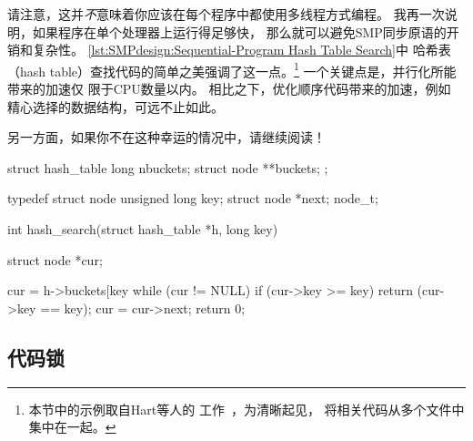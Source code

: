 请注意，这并\emph{不}意味着你应该在每个程序中都使用多线程方式编程。
我再一次说明，如果程序在单个处理器上运行得足够快，
那么就可以避免SMP同步原语的开销和复杂性。
\cref{lst:SMPdesign:Sequential-Program Hash Table Search}中
哈希表（hash table）查找代码的简单之美强调了这一点。\footnote{
	本节中的示例取自Hart等人的
	工作~\cite{ThomasEHart2006a}，为清晰起见，
	将相关代码从多个文件中集中在一起。}
一个关键点是，并行化所能带来的加速仅
限于CPU数量以内。
相比之下，优化顺序代码带来的加速，例如
精心选择的数据结构，可远不止如此。

\QuickQuizEnd

另一方面，如果你不在这种幸运的情况中，请继续阅读！

\begin{listing}
\begin{VerbatimL}[commandchars=\\\@\$]
struct hash_table
{
	long nbuckets;
	struct node **buckets;
};

typedef struct node {
	unsigned long key;
	struct node *next;
} node_t;

int hash_search(struct hash_table *h, long key)
{
	struct node *cur;

	cur = h->buckets[key %
	while (cur != NULL) {
		if (cur->key >= key) {
			return (cur->key == key);
		}
		cur = cur->next;
	}
	return 0;
}
\end{VerbatimL}
\caption{顺序程序哈希表搜索}
\label{lst:SMPdesign:Sequential-Program Hash Table Search}
\end{listing}


\subsection{代码锁}
\label{sec:SMPdesign:Code Locking}

